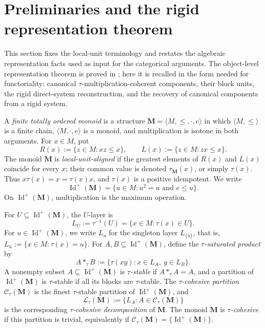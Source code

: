 \documentclass[pdflatex,sn-mathphys-num]{sn-jnl}
\theoremstyle{thmstyleone}%
\theoremstyle{thmstyletwo}%
\theoremstyle{thmstylethree}%
\newcommand{\PosId}{\operatorname{Id}^{+}}
\newcommand{\tprod}[2]{#1\ast_{\tau}#2}
\newcommand{\layer}[1]{L_{#1}}
\newcommand{\Ctau}{\mathcal C_{\tau}}
\newcommand{\Ltau}{\mathcal L_{\tau}}
\begin{document}
\section{Preliminaries and the rigid representation theorem}\label{sec:recap}

This section fixes the local-unit terminology and restates the algebraic representation facts used as input for the categorical arguments.
The object-level representation theorem is proved in \cite{JeneiLUARepresentation}; here it is recalled in the form needed for functoriality: canonical \(\tau\)-multiplication-coherent components, their block units, the rigid direct-system reconstruction, and the recovery of canonical components from a rigid system.

A \emph{finite totally ordered monoid} is a structure \(\mathbf M=\langle M,\le,\cdot,e\rangle\) in which \(\langle M,\le\rangle\) is a finite chain, \(\langle M,\cdot,e\rangle\) is a monoid, and multiplication is isotone in both arguments.
For \(x\in M\), put
\[
R(x):=\{z\in M:xz\le x\},
\qquad
L(x):=\{z\in M:zx\le x\}.
\]
The monoid \(\mathbf M\) is \emph{local-unit-aligned} if the greatest elements of \(R(x)\) and \(L(x)\) coincide for every \(x\); their common value is denoted \(\tau_{\mathbf M}(x)\), or simply \(\tau(x)\).
Thus \(x\tau(x)=x=\tau(x)x\), and \(\tau(x)\) is a positive idempotent.
We write
\[
\PosId(\mathbf M)=\{u\in M:u^2=u\text{ and }e\le u\}.
\]
On \(\PosId(\mathbf M)\), multiplication is the maximum operation.

For \(U\subseteq\PosId(\mathbf M)\), the \(U\)-layer is
\[
\layer{U}:=\tau^{-1}(U)=\{x\in M:\tau(x)\in U\}.
\]
For \(u\in\PosId(\mathbf M)\), we write \(\layer{u}\) for the singleton layer \(\layer{\{u\}}\), that is, \(\layer{u}:=\{x\in M:\tau(x)=u\}\).
For \(A,B\subseteq\PosId(\mathbf M)\), define the \emph{\(\tau\)-saturated product} by
\[
\tprod{A}{B}:=\{\tau(xy):x\in\layer{A},\ y\in\layer{B}\}.
\]
A nonempty subset \(A\subseteq\PosId(\mathbf M)\) is \emph{\(\tau\)-stable} if \(\tprod{A}{A}=A\), and a partition of \(\PosId(\mathbf M)\) is \(\tau\)-stable if all its blocks are \(\tau\)-stable.
The \emph{\(\tau\)-cohesive partition} \(\Ctau(\mathbf M)\) is the finest \(\tau\)-stable partition of \(\PosId(\mathbf M)\), and
\[
\Ltau(\mathbf M):=\{\layer{A}:A\in\Ctau(\mathbf M)\}
\]
is the corresponding \emph{\(\tau\)-cohesive decomposition} of \(\mathbf M\).
The monoid \(\mathbf M\) is \emph{\(\tau\)-cohesive} if this partition is trivial, equivalently if \(\Ctau(\mathbf M)=\{\PosId(\mathbf M)\}\).
\end{document}
